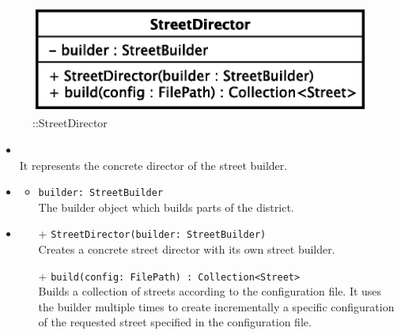 \begin{figure}[h]
\centering
\includegraphics[scale=0.6,keepaspectratio]{images/solution/app/backend/street_director.eps}
\caption{\pReactiveBuild::StreetDirector}
\label{fig:sd-app-street_director}
\end{figure}
\FloatBarrier
\begin{itemize}
  \item \textbf{\descr} \\
    It represents the concrete director of the street builder.
  \item \textbf{\attrs}
  \begin{itemize}
    \item \texttt{builder: StreetBuilder} \\
The builder object which builds parts of the district.
  \end{itemize}
  \item \textbf{\ops}
  \begin{itemize} 
    \item[+] \texttt{StreetDirector(builder: StreetBuilder)} \\
Creates a concrete street director with its own street builder.
    \item[+] \texttt{build(config: FilePath) : Collection<Street>} \\
Builds a collection of streets according to the configuration file. 
It uses the builder multiple times to create incrementally a 
specific configuration of the requested street specified 
in the configuration file. 
  \end{itemize}
\end{itemize}
